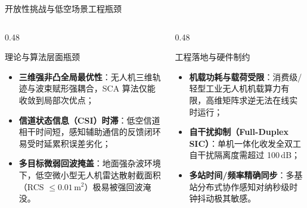 \documentclass[aspectratio=169, 10pt]{ctexbeamer}
\begin{document}
\begin{frame}{开放性挑战与低空场景工程瓶颈}
  \begin{columns}
    \begin{column}{0.48\textwidth}
      \begin{block}{理论与算法层面瓶颈}
        \begin{itemize}
          \item \textbf{三维强非凸全局最优性}：无人机三维轨迹与波束赋形强耦合，SCA 算法仅能收敛到局部次优点；
          \item \textbf{信道状态信息（CSI）时滞}：低空信道相干时间短，感知辅助通信的反馈闭环易受时延累积误差劣化；
          \item \textbf{多目标微弱回波掩盖}：地面强杂波环境下，低空微小型无人机雷达散射截面积（RCS $\le 0.01\,\text{m}^2$）极易被强回波淹没。
        \end{itemize}
      \end{block}
    \end{column}
    \begin{column}{0.48\textwidth}
      \begin{block}{工程落地与硬件制约}
        \begin{itemize}
          \item \textbf{机载功耗与载荷受限}：消费级/轻型工业无人机机载算力有限，高维矩阵求逆无法在线实时运行；
          \item \textbf{自干扰抑制（Full-Duplex SIC）}：单机一体化收发全双工自干扰隔离度需超过 100\,dB；
          \item \textbf{多站时间/频率精确同步}：多基站分布式协作感知对纳秒级时钟抖动极其敏感。
        \end{itemize}
      \end{block}
    \end{column}
  \end{columns}
\end{frame}

\end{document}
